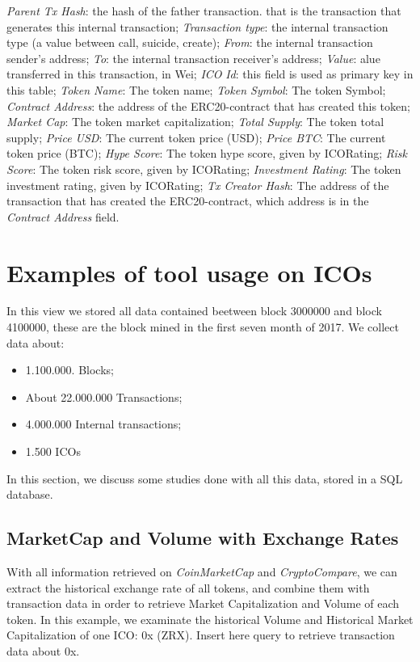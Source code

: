 \begin{outline}
        \2 \textit{Parent Tx Hash}: the hash of the father transaction. that is the transaction that generates this internal transaction;
        \2 \textit{Transaction type}: the internal transaction type (a value between call, suicide, create);
        \2 \textit{From}: the internal transaction sender's address;
        \2 \textit{To}: the internal transaction receiver's address;
        \2 \textit{Value}: alue transferred in this transaction, in Wei;
    \1 \textit{ICO}
        \2 \textit{Id}: this field is used as primary key in this table;
        \2 \textit{Token Name}: The token name;
        \2 \textit{Token Symbol}: The token Symbol;
        \2 \textit{Contract Address}: the address of the ERC20-contract that has created this token;
        \2 \textit{Market Cap}: The token market capitalization;
        \2 \textit{Total Supply}: The token total supply;
        \2 \textit{Price USD}: The current token price (USD);
        \2 \textit{Price BTC}: The current token price (BTC);
        \2 \textit{Hype Score}: The token hype score, given by ICORating;
        \2 \textit{Risk Score}: The token risk score, given by ICORating;
        \2 \textit{Investment Rating}: The token investment rating, given by ICORating;
        \2 \textit{Tx Creator Hash}: The address of the transaction that has created the ERC20-contract, which address is in the \textit{Contract Address} field.
\end{outline}

\section{Examples of tool usage on ICOs}
In this view we stored all data contained beetween block 3000000 and block 4100000, these are the block mined in the first seven month of 2017.
We collect data about:
\begin{itemize}
    \item 1.100.000. Blocks;
    \item About 22.000.000 Transactions;
    \item 4.000.000 Internal transactions;
    \item 1.500 ICOs
\end{itemize}
In this section, we discuss some studies done with all this data, stored in a SQL database.
\subsection{MarketCap and Volume with Exchange Rates}
With all information retrieved on \textit{CoinMarketCap} and \textit{CryptoCompare}, we can extract the historical exchange rate of all tokens, and combine them with transaction data in order to retrieve Market Capitalization and Volume of each token.
\newline
In this example, we examinate the historical Volume and Historical Market Capitalization of one ICO: 0x (ZRX).
\newline
Insert here query to retrieve transaction data about 0x.

